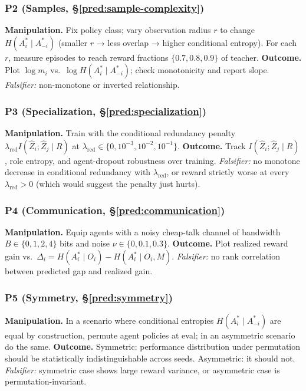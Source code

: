 \documentclass[10pt, letterpaper]{article}
\begin{document}
\subsubsection*{P2 (Samples, \S\ref{pred:sample-complexity})}
\textbf{Manipulation.} Fix policy class; vary observation radius $r$ to change $H(A_i^*\mid A_{-i}^*)$ (smaller $r$ → less overlap → higher conditional entropy). For each $r$, measure episodes to reach reward fractions $\{0.7, 0.8, 0.9\}$ of teacher.
\textbf{Outcome.} Plot $\log m_i$ vs.\ $\log H(A_i^*\mid A_{-i}^*)$; check monotonicity and report slope. \emph{Falsifier:} non-monotone or inverted relationship.

\subsubsection*{P3 (Specialization, \S\ref{pred:specialization})}
\textbf{Manipulation.} Train with the conditional redundancy penalty $\lambda_\text{red} I(\hat{Z}_i; \hat{Z}_j \mid R)$ at $\lambda_\text{red} \in \{0, 10^{-3}, 10^{-2}, 10^{-1}\}$.
\textbf{Outcome.} Track $I(\hat{Z}_i; \hat{Z}_j \mid R)$, role entropy, and agent-dropout robustness over training. \emph{Falsifier:} no monotone decrease in conditional redundancy with $\lambda_\text{red}$, or reward strictly worse at every $\lambda_\text{red} > 0$ (which would suggest the penalty just hurts).

\subsubsection*{P4 (Communication, \S\ref{pred:communication})}
\textbf{Manipulation.} Equip agents with a noisy cheap-talk channel of bandwidth $B \in \{0, 1, 2, 4\}$ bits and noise $\nu \in \{0, 0.1, 0.3\}$.
\textbf{Outcome.} Plot realized reward gain vs.\ $\Delta_i = H(A_i^*\mid O_i) - H(A_i^*\mid O_i, M)$. \emph{Falsifier:} no rank correlation between predicted gap and realized gain.

\subsubsection*{P5 (Symmetry, \S\ref{pred:symmetry})}
\textbf{Manipulation.} In a scenario where conditional entropies $H(A_i^*\mid A_{-i}^*)$ are equal by construction, permute agent policies at eval; in an asymmetric scenario do the same.
\textbf{Outcome.} Symmetric: performance distribution under permutation should be statistically indistinguishable across seeds. Asymmetric: it should not. \emph{Falsifier:} symmetric case shows large reward variance, or asymmetric case is permutation-invariant.
\end{document}
